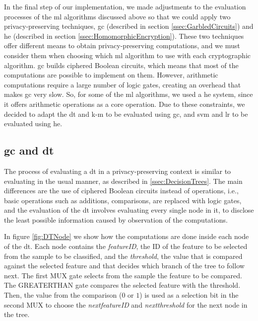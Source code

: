 In the final step of our implementation, we made adjustments to the evaluation processes of the \ac{ml} algorithms discussed above so that we could apply two privacy-preserving techniques, \ac{gc} (described in section \ref{ssec:GarbledCircuits}) and \ac{he} (described in section \ref{ssec:HomomorphicEncryption}).
These two techniques offer different means to obtain privacy-preserving computations, and we must consider them when choosing which \ac{ml} algorithm to use with each cryptographic algorithm. \ac{gc} builds ciphered Boolean circuits, which means that most of the computations are possible to implement on them. However, arithmetic computations require a large number of logic gates, creating an overhead that makes \ac{gc} very slow. So, for some of the \ac{ml} algorithms, we used a \ac{he} system, since it offers arithmetic operations as a core operation. Due to these constraints, we decided to adapt the \ac{dt} and \ac{k-m} to be evaluated using \ac{gc}, and \ac{svm} and \ac{lr} to be evaluated using \ac{he}.


\subsection{\acl{gc} and \acl{dt}}
\label{ssec:GCandDT}

The process of evaluating a \ac{dt} in a privacy-preserving context is similar to evaluating in the usual manner, as described in \ref{ssec:DecisionTrees}. The main differences are the use of ciphered Boolean circuits instead of operations, i.e., basic operations such as additions, comparisons, are replaced with logic gates, and the evaluation of the \ac{dt} involves evaluating every single node in it, to disclose the least possible information caused by observation of the computations.

In figure \ref{fig:DTNode} we show how the computations are done inside each node of the \ac{dt}. Each node contains the \textit{featureID}, the ID of the feature to be selected from the sample to be classified, and the \textit{threshold}, the value that is compared against the selected feature and that decides which branch of the tree to follow next. The first MUX gate selects from the sample the feature to be compared. The GREATERTHAN gate compares the selected feature with the threshold. Then, the value from the comparison ($0$ or $1$) is used as a selection bit in the second MUX to choose the \textit{next\textunderscore featureID} and \textit{next\textunderscore threshold} for the next node in the tree. 


